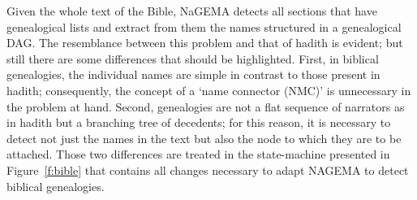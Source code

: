 \documentclass[11pt]{article}
\begin{document}
\begin{figure}[tb]
\end{figure}

Given the whole text of the Bible, NaGEMA detects all sections that have genealogical lists
and extract from them the names structured in a genealogical DAG. The resemblance between this problem and that of hadith is evident; 
but still there are some differences that should be highlighted. 
First, in biblical genealogies, the individual names are simple in contrast to those present in hadith; 
consequently, the concept of a `name connector (NMC)' is unnecessary in the problem at hand.
Second, genealogies are not a flat sequence of narrators as in hadith but a branching tree of decedents; 
for this reason, it is necessary to detect not just the names in the text but also the node to which they are to be attached.
Those two differences are treated in the state-machine presented in Figure~\ref{f:bible} that contains all changes necessary to adapt NAGEMA to detect 
biblical genealogies.
\end{document}
